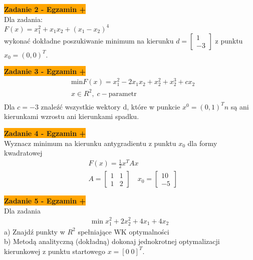 \documentclass[a4paper,11pt]{article}
\begin{document}
\begin{framed}
\textbf{\colorbox{orange}{Zadanie 2 - Egzamin +}} \\
Dla zadania: \\
\( F(x)=x_1^2+x_1x_2+(x_1-x_2)^4 \) \\
wykonać dokładne poszukiwanie minimum na kierunku \( d = \begin{bmatrix}
1 \\ -3 
\end{bmatrix} \) 
z punktu \( x_0 = (0,0)^T \).
\end{framed}

\begin{framed}
\textbf{\colorbox{orange}{Zadanie 3 - Egzamin +}} \\
\begin{align*}
&\text{min} F(x) = x_1^2 -2x_1x_2+x_2^2+x_2^3+cx_2 \\
&x \in R^2, \; c - \text{parametr} \\
\end{align*}
Dla \( c = -3 \) znaleźć wszystkie wektory d, które w punkcie \( x^0 = (0,1)^T n \) są ani kierunkami wzrostu ani kierunkami spadku.
\end{framed}

\begin{framed}
\textbf{\colorbox{orange}{Zadanie 4 - Egzamin +}} \\
Wyznacz minimum na kierunku  antygradientu z punktu \( x_0 \)  dla formy kwadratowej
\begin{align*}
&F(x)=\frac{1}{2}x^TAx \\
& A = \begin{bmatrix}
1 & 1 \\
1 & 2
\end{bmatrix}
\quad 
x_0 = \begin{bmatrix}
10 \\
-5
\end{bmatrix}
\end{align*}
\end{framed}

\begin{framed}
\textbf{\colorbox{orange}{Zadanie 5 - Egzamin +}} \\
Dla zadania
\begin{align*}
\text{min} \; x_1^2 + 2x_2^2 + 4x_1 + 4x_2 
\end{align*}
a) Znajdź punkty w \( R^2 \) spełniające WK optymalności \\
b) Metodą analityczną (dokładną) dokonaj jednokrotnej optymalizacji kierunkowej z punktu startowego \( x = [ 0 \; 0 ]^T \).
\end{framed}
\end{document}
